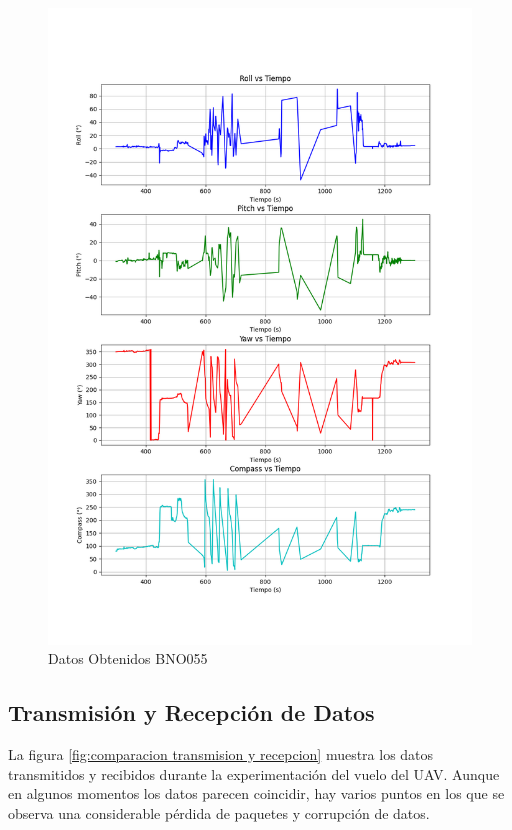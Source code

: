         \begin{figure}[H]
            \centering
            \includegraphics[width=15 cm]{Imagenes/Vuelo/BNO055_orientacion.png}
            \caption{Datos Obtenidos BNO055}
            \label{fig:datos obtenidos BNO055}
        \end{figure}


    \subsection{Transmisión y Recepción de Datos}

        La figura \ref{fig:comparacion transmision y recepcion} muestra los datos transmitidos y recibidos durante la experimentación del vuelo del UAV. Aunque en algunos momentos los datos parecen coincidir, hay varios puntos en los que se observa una considerable pérdida de paquetes y corrupción de datos.\\

